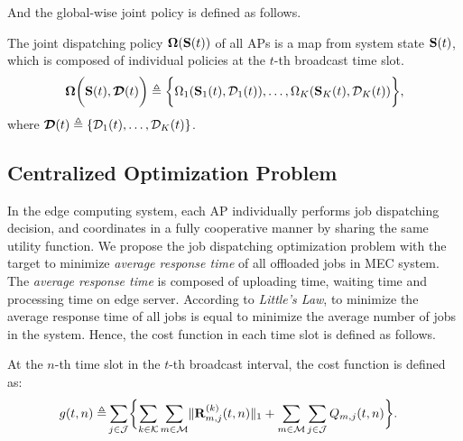 And the global-wise joint policy is defined as follows.
\begin{definition}
    The joint dispatching policy $\boldsymbol{\Omega}(\mathbf{S}(t))$ of all APs is a map from system state $\mathbf{S}(t)$, which is composed of individual policies at the $t$-th broadcast time slot.
    \begin{align}
        \boldsymbol{\Omega}\bigg( \mathbf{S}(t), \boldsymbol{\mathcal{D}}(t) \bigg) \triangleq \bigg\{
            \Omega_{1}(\mathbf{S}_{1}(t), \mathcal{D}_{1}(t)), \dots, \Omega_{K}(\mathbf{S}_{K}(t),\mathcal{D}_{K}(t))
        \bigg\},
    \end{align}
    where $\boldsymbol{\mathcal{D}}(t) \triangleq \{ \mathcal{D}_{1}(t), \dots, \mathcal{D}_{K}(t) \}$.
\end{definition}
\subsection{Centralized Optimization Problem}
In the edge computing system, each AP individually performs job dispatching decision, and coordinates in a fully cooperative manner by sharing the same utility function.
We propose the job dispatching optimization problem with the target to minimize \emph{average response time} of all offloaded jobs in MEC system.
The \emph{average response time} is composed of uploading time, waiting time and processing time on edge server.
According to \emph{Little's Law}, to minimize the average response time of all jobs is equal to minimize the average number of jobs in the system.
Hence, the cost function in each time slot is defined as follows.
\begin{definition}
    At the $n$-th time slot in the $t$-th broadcast interval, the cost function is defined as:
    \begin{align}
        g(t,n) \define & \sum_{j\in\jSpace}\Brace{
            \sum_{k\in\apSet}\sum_{m\in\esSet} \Inorm{\vec{R}^{(k)}_{m,j}(t,n)} + \sum_{m\in\esSet}\sum_{j\in\jSpace} Q_{m,j}(t,n)
        }.
    \end{align}
\end{definition}

